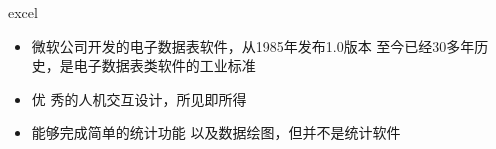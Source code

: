 \documentclass{beamerthemeMono}
\begin{document}
\begin{frame}[t]{\subsecname}{excel}
  \begin{itemize}
     \item 微软公司开发的电子数据表软件，从1985年发布1.0版本
    至今已经30多年历史，是电子数据表类软件的工业标准 \item 优
    秀的人机交互设计，所见即所得 \item 能够完成简单的统计功能
    以及数据绘图，但并不是统计软件
  \end{itemize}

\begin{overlayarea}  {\textwidth}{\textheight} 

  

\end{overlayarea}
\end{frame}
\end{document}
